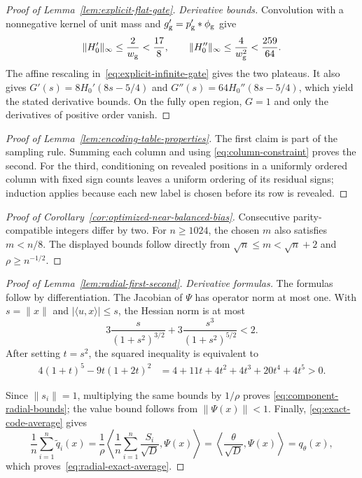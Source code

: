 \documentclass{article}
\theoremstyle{definition}
\begin{document}
\begin{proof}[Proof of Lemma~\ref{lem:explicit-flat-gate}]
\emph{Derivative bounds.}
Convolution with a nonnegative kernel of unit mass and
$g_{\rm g}'=p_{\rm g}'*\phi_{\rm g}$ give
\begin{equation}
 \|H_0'\|_\infty\le\frac2{w_{\rm g}}<\frac{17}{8},
 \qquad
 \|H_0''\|_\infty\le\frac4{w_{\rm g}^2}<\frac{259}{64}.
 \label{eq:base-gate-derivatives}
\end{equation}
The affine rescaling in~\eqref{eq:explicit-infinite-gate} gives the two
plateaus.  It also gives $G'(s)=8H_0'(8s-5/4)$ and
$G''(s)=64H_0''(8s-5/4)$, which yield the stated derivative bounds.  On the
fully open region, $G=1$ and only the derivatives of positive order vanish.
\end{proof}

\begin{proof}[Proof of Lemma~\ref{lem:encoding-table-properties}]
The first claim is part of the sampling rule.  Summing each column and using
\eqref{eq:column-constraint} proves the second.  For the third, conditioning on
revealed positions in a uniformly ordered column with fixed sign counts leaves a uniform
ordering of its residual signs; induction applies because each new label is
chosen before its row is revealed.
\end{proof}

\begin{proof}[Proof of Corollary~\ref{cor:optimized-near-balanced-bias}]
Consecutive parity-compatible integers differ by two.  For $n\ge1024$, the
chosen $m$ also satisfies $m<n/8$.  The displayed bounds follow directly from
$\sqrt n\le m<\sqrt n+2$ and $\rho\ge n^{-1/2}$.
\end{proof}

\begin{proof}[Proof of Lemma~\ref{lem:radial-first-second}]
\emph{Derivative formulas.}
The formulas follow by differentiation.  The Jacobian of $\Psi$ has operator
norm at most one.  With $s=\|x\|$ and $|\langle u,x\rangle|\le s$, the Hessian
norm is at most
\begin{equation}
 3\frac{s}{(1+s^2)^{3/2}}
 +3\frac{s^3}{(1+s^2)^{5/2}}<2.
\end{equation}
After setting $t=s^2$, the squared inequality is equivalent to
\begin{equation}
\begin{aligned}
 4(1+t)^5-9t(1+2t)^2
 &=4+11t+4t^2+4t^3+20t^4+4t^5>0.
\end{aligned}
\end{equation}

Since $\|s_i\|=1$, multiplying the same bounds by $1/\rho$ proves
\eqref{eq:component-radial-bounds}; the value bound follows from
$\|\Psi(x)\|<1$.  Finally, \eqref{eq:exact-code-average} gives
\[
 \frac1n\sum_{i=1}^n\widetilde q_i(x)
 =\frac1\rho\left\langle
   \frac1n\sum_{i=1}^n\frac{S_i}{\sqrt D},\Psi(x)
  \right\rangle
 =\left\langle\frac\theta{\sqrt D},\Psi(x)\right\rangle
 =q_\theta(x),
\]
which proves~\eqref{eq:radial-exact-average}.
\end{proof}
\end{document}
